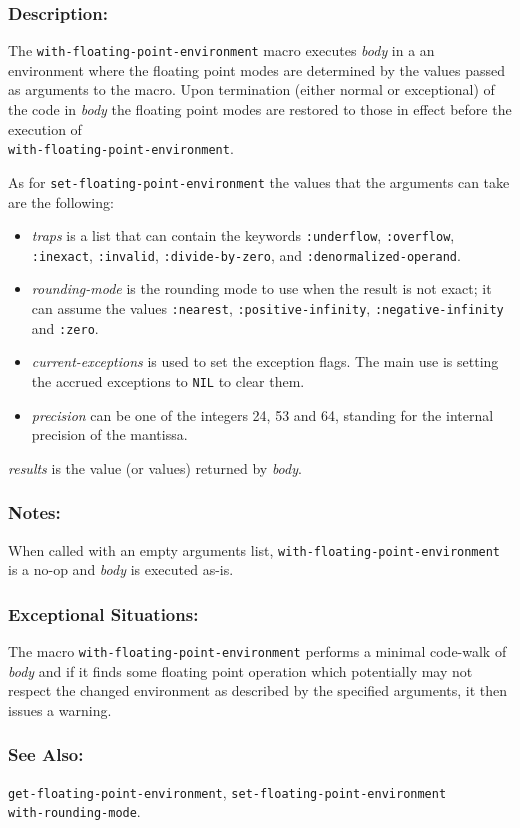 \documentclass[10pt,fleqn]{article}
\newcommand{\code}[1]{\texttt{#1}}
\newcommand{\varname}[1]{\textit{#1}}
\newcommand{\DDescription}{\subsubsection*{Description:}}
\newcommand{\DExceptional}{\subsubsection*{Exceptional Situations:}}
\newcommand{\DNotes}{\subsubsection*{Notes:}}
\newcommand{\DSeeAlso}{\subsubsection*{See Also:}}
\begin{document}
\DDescription{}

The \code{with-floating-point-environment} macro executes \varname{body} in a
an environment where the floating point modes are determined by the
values passed as arguments to the macro.  Upon termination (either
normal or exceptional) of the code in \varname{body} the floating
point modes are restored to those in effect before the execution of\\
\code{with-floating-point-environment}.

As for \code{set-floating-point-environment} the values that the arguments
can take are the following:

\begin{itemize}
\item \varname{traps} is a list that can contain the keywords
  \code{:underflow}, \code{:overflow}, \code{:inexact}, \code{:invalid},
  \code{:divide-by-zero}, and \code{:denormalized-operand}.

\item \varname{rounding-mode} is the rounding mode to use when the result is
  not exact; it can assume the values \code{:nearest},
  \code{:positive-infinity}, \code{:negative-infinity} and
  \code{:zero}.

\item \varname{current-exceptions} is used to set the exception flags. The
  main use is setting the accrued exceptions to \code{NIL} to clear
  them.

\item \varname{precision} can be one of the integers 24, 53 and 64,
  standing for the internal precision of the mantissa.
\end{itemize}



\noindent
\varname{results} is the value (or values) returned by \varname{body}.


\DNotes{}

When called with an empty arguments list,
\code{with-floating-point-environment} is a no-op and \varname{body}
is executed as-is.

\DExceptional{}

The macro \code{with-floating-point-environment} performs a minimal
code-walk of \varname{body} and if it finds some floating point
operation which potentially may not respect the changed environment as
described by the specified arguments, it then issues a warning.


\DSeeAlso{}

\code{get-floating-point-environment},
\code{set-floating-point-environment}\\
\code{with-rounding-mode}.
\end{document}
